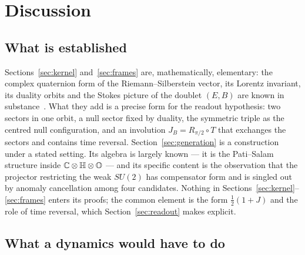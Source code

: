\section{Discussion}\label{sec:discussion}

\subsection{What is established}

Sections~\ref{sec:kernel} and~\ref{sec:frames} are, mathematically, elementary: the complex quaternion form of the Riemann--Silberstein vector,
its Lorentz invariant, its duality orbits and the Stokes picture of the doublet \((E,B)\) are known in substance~\cite{bialynicki}.  What they
add is a precise form for the readout hypothesis: two sectors in one orbit, a null sector fixed by duality, the symmetric triple as the centred
null configuration, and an involution \(J_B=R_{\pi/2}\circ T\) that exchanges the sectors and contains time reversal.  Section~\ref{sec:generation}
is a construction under a stated setting.  Its algebra is largely known --- it is the Pati--Salam structure inside \(\mathbb C\otimes\mathbb H\otimes\mathbb O\)
--- and its specific content is the observation that the projector restricting the weak \(SU(2)\) has compensator form and is singled out by
anomaly cancellation among four candidates.  Nothing in Sections~\ref{sec:kernel}--\ref{sec:frames} enters its proofs; the common element is the
form \(\tfrac12(1+J)\) and the role of time reversal, which Section~\ref{sec:readout} makes explicit.

\subsection{What a dynamics would have to do}

